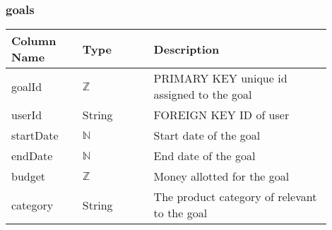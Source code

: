 \documentclass[12pt, titlepage]{article}
\begin{document}
\subsubsection{goals}
\begin{table}[H]
  \begin{tabular}{|p{0.2\linewidth}|p{0.2\linewidth}|p{0.5\linewidth}|}
    \hline
    \textbf{Column Name} & \textbf{Type} & \textbf{Description} \\
    \hline
    goalId & $\mathbb{Z}$ & PRIMARY KEY unique id assigned to the goal \\
    \hline
    userId & String & FOREIGN KEY ID of user \\
    \hline
    startDate & $\mathbb{N}$ & Start date of the goal \\
    \hline
    endDate & $\mathbb{N}$ & End date of the goal \\
    \hline
    budget & $\mathbb{Z}$ & Money allotted for the goal \\
    \hline
    category & String & The product category of relevant to the goal\\
    \hline
  \end{tabular}
\end{table}
\end{document}
